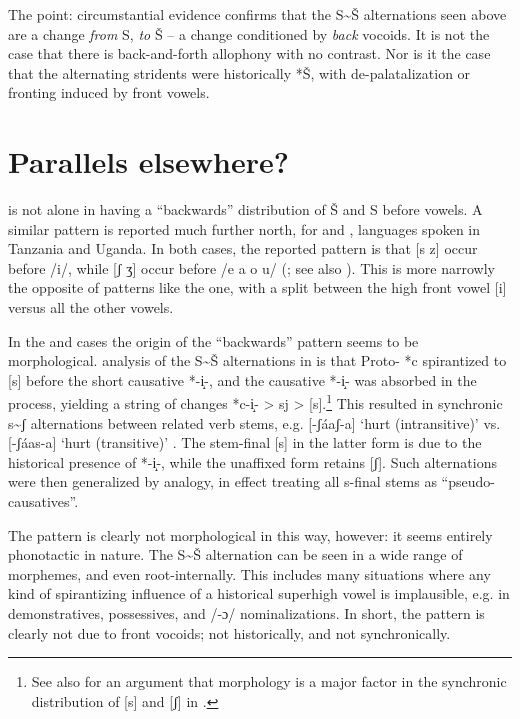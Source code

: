 \documentclass[output=paper,newtxmath,modfonts,nonflat,hidelinks]{langsci/langscibook}
\begin{document}
The point: circumstantial evidence confirms that the S{\textasciitilde}Š alternations seen above are a change \textit{from} S, \textit{to} Š – a change conditioned by \textit{back} vocoids. It is not the case that there is back-and-forth allophony with no contrast. Nor is it the case that the alternating stridents were historically *Š, with de-palatalization or fronting induced by front vowels. 

\section{Parallels elsewhere?}\label{sec:bennett:3}

 is not alone in having a ``backwards'' distribution of Š and S before vowels. A similar pattern is reported much further north, for  and ,  languages spoken in Tanzania and Uganda. In both cases, the reported pattern is that [s z] occur before /i/, while [ʃ ʒ] occur before /e a o u/ \linebreak (\citealt{Byarushengo1975,Hyman2003b}; see also \citealt{Hansson2001,Hansson2010}). This is more narrowly the opposite of patterns like the  one, with a split between the high front vowel [i] versus all the other vowels.

In the  and  cases the origin of the ``backwards'' pattern seems to be morphological.  analysis of the S{\textasciitilde}Š alternations in  is that Proto- *c spirantized to [s] before the short causative *-i̝-, and the causative *-i̝- was absorbed in the process, yielding a string of changes *c-i̝- > sj > [s].\footnote{See also \citet{Bennett&Pulleyblank:2014} for an argument that morphology is a major factor in the synchronic distribution of [s] and [ʃ] in .} This resulted in synchronic s{\textasciitilde}ʃ alternations between related verb stems, e.g. [-ʃáaʃ-a] ‘hurt (intransitive)’ vs. [-ʃáas-a] ‘hurt (transitive)’ \citep[85]{Hyman2003b}. The stem-final [s] in the latter form is due to the historical presence of *-i̝-, while the unaffixed form retains [ʃ]. Such alternations were then generalized by analogy, in effect treating all s-final stems as ``pseudo-causatives''.

The  pattern is clearly not morphological in this way, however: it seems entirely phonotactic in nature. The S{\textasciitilde}Š alternation can be seen in a wide range of morphemes, and even root-internally. This includes many situations where any kind of spirantizing influence of a historical superhigh vowel is implausible, e.g. in demonstratives, possessives, and /-ɔ/ nominalizations. In short, the  pattern is clearly not due to front vocoids; not historically, and not synchronically.
\end{document}
